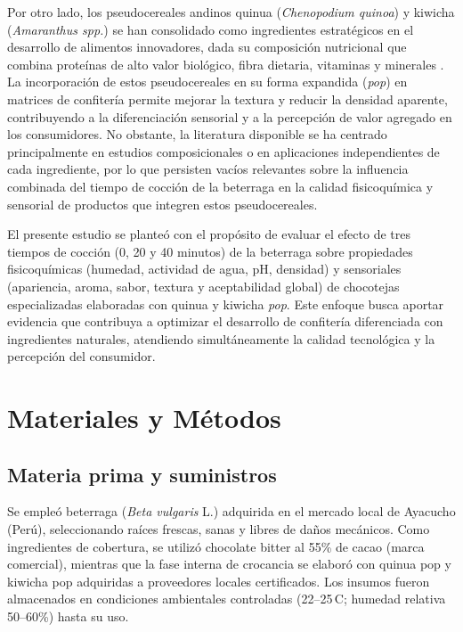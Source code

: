 \documentclass[manuscript,screen,review]{acmart}
\begin{document}
Por otro lado, los pseudocereales andinos quinua (\textit{Chenopodium quinoa}) y kiwicha (\textit{Amaranthus spp.}) se han consolidado como ingredientes estratégicos en el desarrollo de alimentos innovadores, dada su composición nutricional que combina proteínas de alto valor biológico, fibra dietaria, vitaminas y minerales \cite{RepoCarrascoValencia2009,Singh2023}. La incorporación de estos pseudocereales en su forma expandida (\textit{pop}) en matrices de confitería permite mejorar la textura y reducir la densidad aparente, contribuyendo a la diferenciación sensorial y a la percepción de valor agregado en los consumidores. No obstante, la literatura disponible se ha centrado principalmente en estudios composicionales o en aplicaciones independientes de cada ingrediente, por lo que persisten vacíos relevantes sobre la influencia combinada del tiempo de cocción de la beterraga en la calidad fisicoquímica y sensorial de productos que integren estos pseudocereales.

El presente estudio se planteó con el propósito de evaluar el efecto de tres tiempos de cocción (0, 20 y 40 minutos) de la beterraga sobre propiedades fisicoquímicas (humedad, actividad de agua, pH, densidad) y sensoriales (apariencia, aroma, sabor, textura y aceptabilidad global) de chocotejas especializadas elaboradas con quinua y kiwicha \textit{pop}. Este enfoque busca aportar evidencia que contribuya a optimizar el desarrollo de confitería diferenciada con ingredientes naturales, atendiendo simultáneamente la calidad tecnológica y la percepción del consumidor.

\section{Materiales y Métodos}

\subsection{Materia prima y suministros}
Se empleó beterraga (\textit{Beta vulgaris} L.) adquirida en el mercado local de Ayacucho (Perú), seleccionando raíces frescas, sanas y libres de daños mecánicos. Como ingredientes de cobertura, se utilizó chocolate bitter al 55\% de cacao (marca comercial), mientras que la fase interna de crocancia se elaboró con quinua pop y kiwicha pop adquiridas a proveedores locales certificados. Los insumos fueron almacenados en condiciones ambientales controladas (22--25\,\textdegree C; humedad relativa 50--60\%) hasta su uso.
\end{document}
